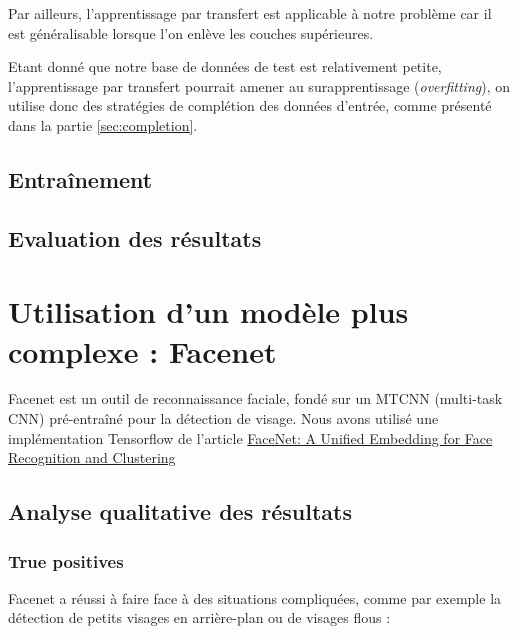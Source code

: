 \documentclass[a4paper,11pt]{article}
\begin{document}
Par ailleurs, l'apprentissage par transfert est applicable à notre problème car il est généralisable
lorsque l'on enlève les couches supérieures.

Etant donné que notre base de données de test est relativement petite, l'apprentissage par transfert pourrait amener au surapprentissage (\textit{overfitting}), on utilise donc des stratégies de complétion des données d'entrée, comme présenté dans la partie \ref{sec:completion}.

    \subsection{Entraînement}
    \subsection{Evaluation des résultats}

\section{Utilisation d'un modèle plus complexe : Facenet}

Facenet est un outil de reconnaissance faciale, fondé sur un MTCNN (multi-task CNN) pré-entraîné pour la détection de visage. Nous avons utilisé une implémentation Tensorflow de l'article \href{https://arxiv.org/abs/1503.03832}{FaceNet: A Unified Embedding for Face Recognition and Clustering}

\subsection{Analyse qualitative des résultats}
\subsubsection{True positives}

Facenet a réussi à faire face à des situations compliquées, comme par exemple la détection de petits visages en arrière-plan ou de visages flous :
\end{document}
